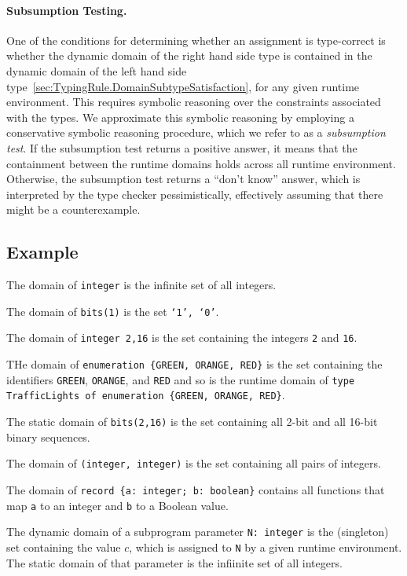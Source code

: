 \documentclass{book}
\begin{document}
  \paragraph{Subsumption Testing.}
  One of the conditions for determining whether an assignment is type-correct is whether the dynamic domain of the
  right hand side type is contained in the dynamic domain of the left hand side type~\ref{sec:TypingRule.DomainSubtypeSatisfaction},
  for any given runtime environment.
  This requires symbolic reasoning over the constraints associated with the types.
  We approximate this symbolic reasoning by employing a conservative symbolic reasoning procedure,
  which we refer to as a \emph{subsumption test}.
  If the subsumption test returns a positive answer, it means that the containment between the runtime domains holds across all
  runtime environment.
  Otherwise, the subsumption test returns a ``don't know'' answer, which is interpreted by the type checker pessimistically,
  effectively assuming that there might be a counterexample.

  \subsection{Example}
  The domain of \texttt{integer} is the infinite set of all integers.

  The domain of \texttt{bits(1)} is the set \texttt{{‘1’, ‘0’}}.

  The domain of \texttt{integer {2,16}} is the set containing the integers \texttt{2} and \texttt{16}.

  THe domain of \texttt{enumeration \{GREEN, ORANGE, RED\}} is the set containing the identifiers
  \texttt{GREEN}, \texttt{ORANGE}, and \texttt{RED} and so is the runtime domain 
  of \texttt{type TrafficLights of enumeration \{GREEN, ORANGE, RED\}}.

  The static domain of \texttt{bits({2,16})} is the set containing all 2-bit and all 16-bit binary sequences.

  The domain of \texttt{(integer, integer)} is the set containing all pairs of integers.

  The domain of \texttt{record \{a: integer;  b: boolean\}} contains all functions that map \texttt{a} to an integer and \texttt{b} to a Boolean value.

  The dynamic domain of a subprogram parameter \texttt{N: integer} is the (singleton) set containing the value $c$,
  which is assigned to \texttt{N} by a given runtime environment. The static domain of that parameter
  is the infiinite set of all integers.
\end{document}
